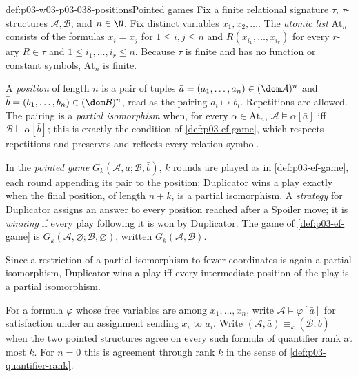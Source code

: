 \begin{hbconvention}{def:p03-w03-p03-038-positions}{Pointed games}
Fix a finite relational signature \(\tau\), \(\tau\)-structures
\(\mathcal A,\mathcal B\), and \(n\in\N\). Fix distinct variables
\(x_1,x_2,\ldots\). The \emph{atomic list} \(\mathrm{At}_n\) consists of
the formulas \(x_i=x_j\) for \(1\le i,j\le n\) and
\(R(x_{i_1},\ldots,x_{i_r})\) for every \(r\)-ary \(R\in\tau\) and
\(1\le i_1,\ldots,i_r\le n\). Because \(\tau\) is finite and has no
function or constant symbols, \(\mathrm{At}_n\) is finite.

A \emph{position} of length \(n\) is a pair of tuples
\(\bar a=(a_1,\ldots,a_n)\in(\dom\mathcal A)^n\) and
\(\bar b=(b_1,\ldots,b_n)\in(\dom\mathcal B)^n\), read as the pairing
\(a_i\mapsto b_i\). Repetitions are allowed. The pairing is a
\emph{partial isomorphism} when, for every \(\alpha\in\mathrm{At}_n\),
\(\mathcal A\models\alpha[\bar a]\) iff \(\mathcal B\models\alpha[\bar b]\);
this is exactly the condition of \cref{def:p03-ef-game}, which respects
repetitions and preserves and reflects every relation symbol.

In the \emph{pointed game} \(G_k(\mathcal A,\bar a;\mathcal B,\bar b)\),
\(k\) rounds are played as in \cref{def:p03-ef-game}, each round
appending its pair to the position; Duplicator wins a play exactly when
the final position, of length \(n+k\), is a partial isomorphism. A
\emph{strategy} for Duplicator assigns an answer to every position reached
after a Spoiler move; it is \emph{winning} if every play following it is won
by Duplicator. The game of \cref{def:p03-ef-game} is
\(G_k(\mathcal A,\varnothing;\mathcal B,\varnothing)\), written
\(G_k(\mathcal A,\mathcal B)\).

Since a restriction of a partial isomorphism to fewer coordinates is
again a partial isomorphism, Duplicator wins a play iff every intermediate
position of the play is a partial isomorphism.

For a formula \(\varphi\) whose free variables are among
\(x_1,\ldots,x_n\), write \(\mathcal A\models\varphi[\bar a]\) for
satisfaction under an assignment sending \(x_i\) to \(a_i\). Write
\((\mathcal A,\bar a)\equiv_k(\mathcal B,\bar b)\) when the two pointed
structures agree on every such formula of quantifier rank at most \(k\).
For \(n=0\) this is agreement through rank \(k\) in the sense of
\cref{def:p03-quantifier-rank}.
\end{hbconvention}

